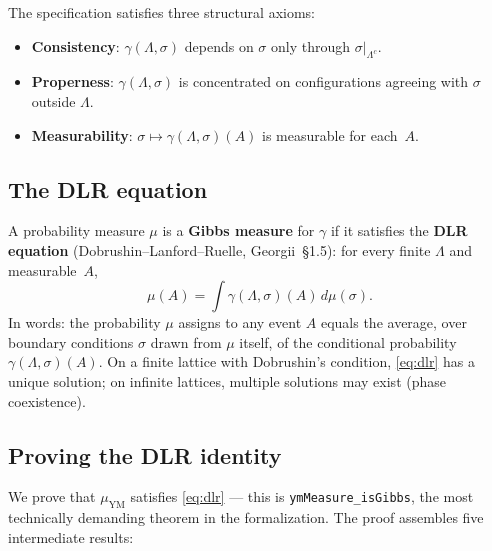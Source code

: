 \documentclass[11pt,a4paper]{article}
\theoremstyle{definition}
\begin{document}
The specification satisfies three structural axioms:
\begin{itemize}
\item \textbf{Consistency}: $\gamma(\Lambda, \sigma)$ depends on
  $\sigma$ only through $\sigma|_{\Lambda^c}$.
\item \textbf{Properness}: $\gamma(\Lambda, \sigma)$ is concentrated
  on configurations agreeing with $\sigma$ outside $\Lambda$.
\item \textbf{Measurability}:
  $\sigma \mapsto \gamma(\Lambda, \sigma)(A)$ is measurable for
  each~$A$.
\end{itemize}

\subsection{The DLR equation}

A probability measure $\mu$ is a \textbf{Gibbs measure} for $\gamma$
if it satisfies the \textbf{DLR equation}
(Dobrushin--Lanford--Ruelle, Georgii~\S1.5): for every finite
$\Lambda$ and measurable~$A$,
\begin{equation}\label{eq:dlr}
  \mu(A) = \int \gamma(\Lambda, \sigma)(A) \, d\mu(\sigma).
\end{equation}
In words: the probability $\mu$ assigns to any event $A$ equals
the average, over boundary conditions $\sigma$ drawn from $\mu$
itself, of the conditional probability $\gamma(\Lambda, \sigma)(A)$.
On a finite lattice with Dobrushin's condition, \eqref{eq:dlr} has
a unique solution; on infinite lattices, multiple solutions may
exist (phase coexistence).

\subsection{Proving the DLR identity}

We prove that $\mu_{\mathrm{YM}}$ satisfies \eqref{eq:dlr} ---
this is \texttt{ymMeasure\_isGibbs}, the most technically demanding
theorem in the formalization. The proof assembles five intermediate
results:
\end{document}
